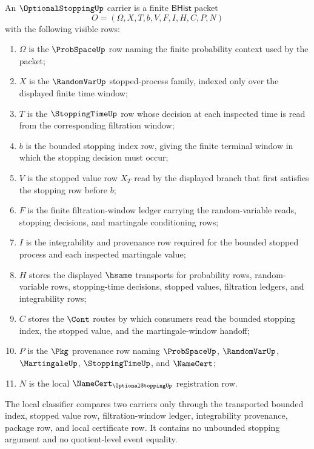 \begin{definition}
\label{def:optional-stopping-carrier}
An $\OptionalStoppingUp$ carrier is a finite $\mathsf{BHist}$ packet
$$
O=(\Omega,X,T,b,V,F,I,H,C,P,N)
$$
with the following visible rows:
\begin{enumerate}
\item $\Omega$ is the $\ProbSpaceUp$ row naming the finite probability context used by the packet;
\item $X$ is the $\RandomVarUp$ stopped-process family, indexed only over the displayed finite time window;
\item $T$ is the $\StoppingTimeUp$ row whose decision at each inspected time is read from the corresponding filtration window;
\item $b$ is the bounded stopping index row, giving the finite terminal window in which the stopping decision must occur;
\item $V$ is the stopped value row $X_T$ read by the displayed branch that first satisfies the stopping row before $b$;
\item $F$ is the finite filtration-window ledger carrying the random-variable reads, stopping decisions, and martingale conditioning rows;
\item $I$ is the integrability and provenance row required for the bounded stopped process and each inspected martingale value;
\item $H$ stores the displayed $\hsame$ transports for probability rows, random-variable rows, stopping-time decisions, stopped values, filtration ledgers, and integrability rows;
\item $C$ stores the $\Cont$ routes by which consumers read the bounded stopping index, the stopped value, and the martingale-window handoff;
\item $P$ is the $\Pkg$ provenance row naming $\ProbSpaceUp$, $\RandomVarUp$, $\MartingaleUp$, $\StoppingTimeUp$, and $\NameCert$;
\item $N$ is the local $\NameCert_{\OptionalStoppingUp}$ registration row.
\end{enumerate}
The local classifier compares two carriers only through the transported bounded index, stopped value row, filtration-window ledger, integrability provenance, package row, and local certificate row. It contains no unbounded stopping argument and no quotient-level event equality.
\end{definition}

